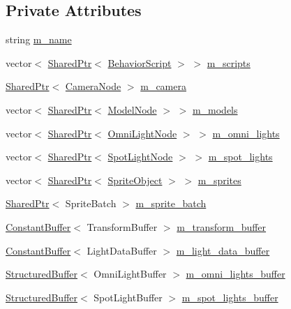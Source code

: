 \subsection*{Private Attributes}
\begin{DoxyCompactItemize}
\item 
string \hyperlink{classmage_1_1_scene_a6cc8cb08b1853c4e3063b33a94e8fb47}{m\+\_\+name}
\item 
vector$<$ \hyperlink{namespacemage_a1e01ae66713838a7a67d30e44c67703e}{Shared\+Ptr}$<$ \hyperlink{classmage_1_1_behavior_script}{Behavior\+Script} $>$ $>$ \hyperlink{classmage_1_1_scene_a84548bf6978f8955ce5892cb23536a4e}{m\+\_\+scripts}
\item 
\hyperlink{namespacemage_a1e01ae66713838a7a67d30e44c67703e}{Shared\+Ptr}$<$ \hyperlink{classmage_1_1_camera_node}{Camera\+Node} $>$ \hyperlink{classmage_1_1_scene_a39c785951d9fb99477c1894eabba0cc6}{m\+\_\+camera}
\item 
vector$<$ \hyperlink{namespacemage_a1e01ae66713838a7a67d30e44c67703e}{Shared\+Ptr}$<$ \hyperlink{classmage_1_1_model_node}{Model\+Node} $>$ $>$ \hyperlink{classmage_1_1_scene_a01132a667fbc1517f11ae561bc221071}{m\+\_\+models}
\item 
vector$<$ \hyperlink{namespacemage_a1e01ae66713838a7a67d30e44c67703e}{Shared\+Ptr}$<$ \hyperlink{namespacemage_a85082c7e15a2bbf19b1753b7de6c45db}{Omni\+Light\+Node} $>$ $>$ \hyperlink{classmage_1_1_scene_a881c3dd7e85e5069650f29fd2722bf78}{m\+\_\+omni\+\_\+lights}
\item 
vector$<$ \hyperlink{namespacemage_a1e01ae66713838a7a67d30e44c67703e}{Shared\+Ptr}$<$ \hyperlink{namespacemage_a46c8f54b869a5dc07f520c600b9046bd}{Spot\+Light\+Node} $>$ $>$ \hyperlink{classmage_1_1_scene_a4e1954bc0b812d6a71123ca3ac9eeb75}{m\+\_\+spot\+\_\+lights}
\item 
vector$<$ \hyperlink{namespacemage_a1e01ae66713838a7a67d30e44c67703e}{Shared\+Ptr}$<$ \hyperlink{classmage_1_1_sprite_object}{Sprite\+Object} $>$ $>$ \hyperlink{classmage_1_1_scene_a7379b399f02999f89f6ccda5bfa01b02}{m\+\_\+sprites}
\item 
\hyperlink{namespacemage_a1e01ae66713838a7a67d30e44c67703e}{Shared\+Ptr}$<$ Sprite\+Batch $>$ \hyperlink{classmage_1_1_scene_a7a334e1b7764532817f10efbc0b91a82}{m\+\_\+sprite\+\_\+batch}
\item 
\hyperlink{structmage_1_1_constant_buffer}{Constant\+Buffer}$<$ Transform\+Buffer $>$ \hyperlink{classmage_1_1_scene_a2e57c981725d0a64bfc8f82381ac3d6a}{m\+\_\+transform\+\_\+buffer}
\item 
\hyperlink{structmage_1_1_constant_buffer}{Constant\+Buffer}$<$ Light\+Data\+Buffer $>$ \hyperlink{classmage_1_1_scene_aa74ca1637e0a88546135d64bf3614f29}{m\+\_\+light\+\_\+data\+\_\+buffer}
\item 
\hyperlink{structmage_1_1_structured_buffer}{Structured\+Buffer}$<$ Omni\+Light\+Buffer $>$ \hyperlink{classmage_1_1_scene_a274ed5e548431ba805513a86a00bbaf1}{m\+\_\+omni\+\_\+lights\+\_\+buffer}
\item 
\hyperlink{structmage_1_1_structured_buffer}{Structured\+Buffer}$<$ Spot\+Light\+Buffer $>$ \hyperlink{classmage_1_1_scene_a64118c052d728ac988031898fd2d757d}{m\+\_\+spot\+\_\+lights\+\_\+buffer}
\end{DoxyCompactItemize}


